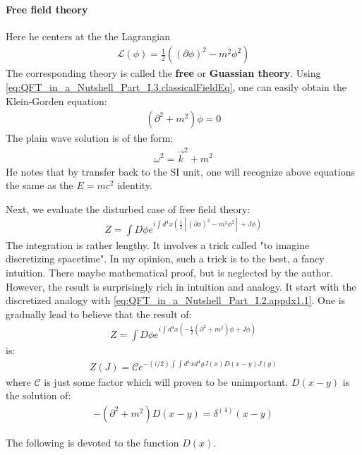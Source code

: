 \documentclass{book}
\numberwithin{equation}{subsection} %
\theoremstyle{definition}
\begin{document}
\paragraph{Free field theory}

Here he centers at the the Lagrangian
\begin{align}
    \mathcal{L}(\phi)=\frac{1}{2}\left( (\partial\phi)^2-m^2\phi^2\right)
\end{align}
The corresponding theory is called the \textbf{free} or 
\textbf{Guassian theory}. Using 
\ref{eq:QFT_in_a_Nutshell_Part_I.3.classicalFieldEq}, one can easily
obtain the Klein-Gorden equation:
\begin{align}
    (\partial^2+m^2)\phi=0
\end{align}
The plain wave solution is of the form:
\begin{align}
    \omega^2=\vec{k}^2+m^2
\end{align}
He notes that by transfer back to the SI unit, one will
recognize above equations the same as the $E=mc^2$ identity.

Next, we evaluate the disturbed case of free field theory:
\begin{align}
    Z = \int D\phi e^{i\int d^4x \left( \frac{1}{2} 
        [(\partial\phi)^2-m^2\phi^2]+J\phi \right)
        }
\end{align}
The integration is rather lengthy. It involves a trick called
"to imagine discretizing spacetime". In my opinion, such a trick
is to the best, a fancy intuition. There maybe mathematical proof,
but is neglected by the author. However, the result is surprisingly
rich in intuition and analogy. It start with the discretized
analogy with \eqref{eq:QFT_in_a_Nutshell_Part_I.2.appdx1.1}. One
is gradually lead to believe that the result of:
\begin{align}
    Z = \int D\phi e^{ i\int d^4x 
        \left(-\frac{1}{2}(\partial^2+m^2)\phi+J\phi \right)}
\end{align}
is:
\begin{align}
    Z(J) = \mathcal{C}e^{-(i/2) \int\int d^4xd^4y J(x)D(x-y)J(y)}
\end{align}
where $\mathcal{C}$ is just some factor which will proven to be
unimportant. $D(x-y)$ is the solution of:
\begin{align}
    \label{eq:QFT_in_a_Nutshell_Part_I.3.2}
    -(\partial^2+m^2)D(x-y)=\delta^{(4)}(x-y)
\end{align}

The following is devoted to the function $D(x)$.
\end{document}
